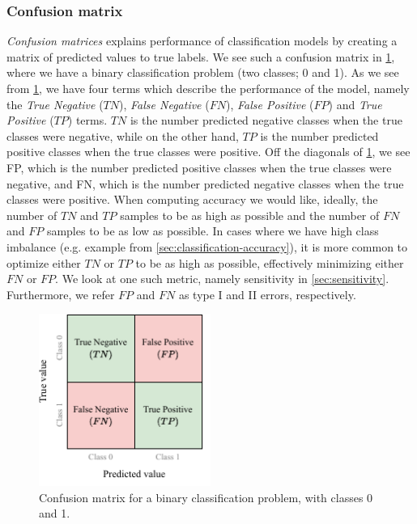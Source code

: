 \subsubsection{Confusion matrix}
\label{sec:confusion-matrix}
\textit{Confusion matrices} explains performance of classification models by creating a matrix of predicted values to true labels. We see such a confusion matrix in \cref{fig:confusion-matrix}, where we have a binary classification problem (two classes; 0 and 1). As we see from \cref{fig:confusion-matrix}, we have four terms which describe the performance of the model, namely the \textit{True Negative} ($TN$), \textit{False Negative} ($FN$), \textit{False Positive} ($FP$) and \textit{True Positive} ($TP$) terms. $TN$ is the number predicted negative classes when the true classes were negative, while on the other hand, $TP$ is the number predicted positive classes when the true classes were positive. Off the diagonals of \cref{fig:confusion-matrix}, we see FP, which is the number predicted positive classes when the true classes were negative, and FN, which is the number predicted negative classes when the true classes were positive. When computing accuracy we would like, ideally, the number of $TN$ and $TP$ samples to be as high as possible and the number of $FN$ and $FP$ samples to be as low as possible. In cases where we have high class imbalance (e.g. example from \cref{sec:classification-accuracy}), it is more common to optimize either $TN$ or $TP$ to be as high as possible, effectively minimizing either $FN$ or $FP$. We look at one such metric, namely sensitivity in \cref{sec:sensitivity}. Furthermore, we refer $FP$ and $FN$ as type I and II errors, respectively.
\begin{figure}
    \centering
    \includegraphics[width=0.5\textwidth]{thesis/figures/confusion-matrix_cropped.pdf}
    \caption{Confusion matrix for a binary classification problem, with classes 0 and 1.}
    \label{fig:confusion-matrix}
\end{figure}

